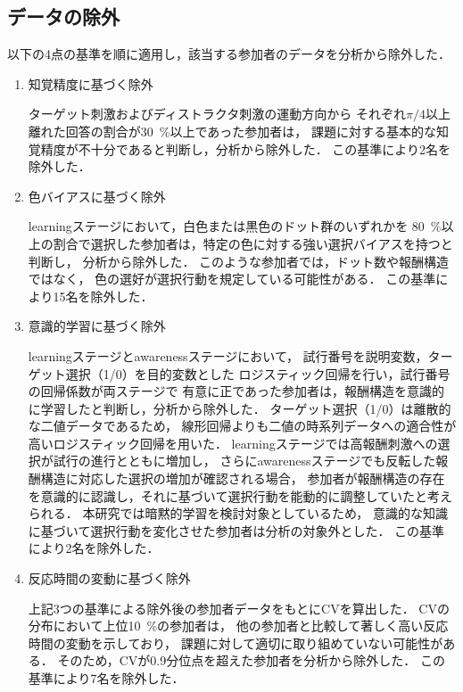 \subsection{データの除外}
以下の4点の基準を順に適用し，該当する参加者のデータを分析から除外した．

\begin{enumerate}
\item 知覚精度に基づく除外

ターゲット刺激およびディストラクタ刺激の運動方向から
それぞれ$\pi/4$以上離れた回答の割合が30~\%以上であった参加者は，
課題に対する基本的な知覚精度が不十分であると判断し，分析から除外した．
この基準により2名を除外した．

\item 色バイアスに基づく除外

learningステージにおいて，白色または黒色のドット群のいずれかを
80~\%以上の割合で選択した参加者は，特定の色に対する強い選択バイアスを持つと判断し，
分析から除外した．
このような参加者では，ドット数や報酬構造ではなく，
色の選好が選択行動を規定している可能性がある．
この基準により15名を除外した．

\item 意識的学習に基づく除外

learningステージとawarenessステージにおいて，
試行番号を説明変数，ターゲット選択（1/0）を目的変数とした
ロジスティック回帰を行い，試行番号の回帰係数が両ステージで
有意に正であった参加者は，報酬構造を意識的に学習したと判断し，分析から除外した．
ターゲット選択（1/0）は離散的な二値データであるため，
線形回帰よりも二値の時系列データへの適合性が高いロジスティック回帰を用いた．
learningステージでは高報酬刺激への選択が試行の進行とともに増加し，
さらにawarenessステージでも反転した報酬構造に対応した選択の増加が確認される場合，
参加者が報酬構造の存在を意識的に認識し，それに基づいて選択行動を能動的に調整していたと考えられる．
本研究では暗黙的学習を検討対象としているため，
意識的な知識に基づいて選択行動を変化させた参加者は分析の対象外とした．
この基準により2名を除外した．

\item 反応時間の変動に基づく除外

上記3つの基準による除外後の参加者データをもとにCVを算出した．
CVの分布において上位10~\%の参加者は，
他の参加者と比較して著しく高い反応時間の変動を示しており，
課題に対して適切に取り組めていない可能性がある．
そのため，CVが0.9分位点を超えた参加者を分析から除外した．
この基準により7名を除外した．

\end{enumerate}

